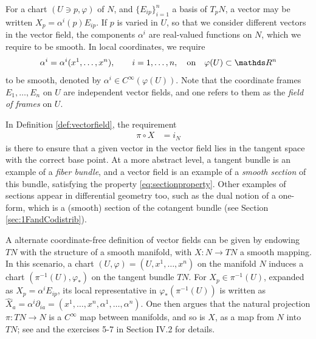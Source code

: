 For a chart $(U\ni p, \varphi)$ of $N$, and $\{E_{ip}\}_{i = 1}^n$ a basis of $T_pN$, a vector may be written $X_p = \alpha^i(p) E_{ip}$. If $p$ is varied in $U$, so that we consider different vectors in the vector field, the components $\alpha^i$ are real-valued functions on $N$, which we require to be smooth. In local coordinates, we require 
\begin{equation}\label{eq:vectorfieldcoeff}
\begin{aligned}
\alpha^i = \alpha^i(x^1, \dots, x^n), \qquad i = 1, \dots, n, \quad \text{on}\quad \varphi(U)\subset \R^n
\end{aligned}
\end{equation} 
to be smooth, denoted by $\alpha^i \in C^{\infty}(\varphi(U))$. Note that the coordinate frames $E_1, \dots, E_n$ on $U$ are independent vector fields, and one refers to them as the \textit{field of frames} on $U$. 
\begin{remark}
In Definition \ref{def:vectorfield}, the requirement 
\begin{align}\label{eq:sectionproperty}
\pi \circ X &= i_N
\end{align}
 is there to ensure that a given vector in the vector field lies in the tangent space with the correct base point. At a more abstract level, a tangent bundle is an example of a \textit{fiber bundle}, and a vector field is an example of a \textit{smooth section} of this bundle, satisfying the property \ref{eq:sectionproperty}. Other examples of sections appear in differential geometry too, such as the dual notion of a one-form, which is a (smooth) section of the cotangent bundle (see Section \ref{sec:1FandCodistrib}). 
\end{remark}


A alternate coordinate-free definition of vector fields can be given by endowing $TN$ with the structure of a smooth manifold, with $X:N\rightarrow TN$ a smooth mapping. In this scenario, a chart $(U, \varphi) = (U, x^1, \dots, x^n)$ on the manifold $N$ induces a chart $(\pi^{-1}(U), \varphi_*)$ on the tangent bundle $TN$. For $X_p\in \pi^{-1}(U)$, expanded as $X_p = \alpha^i E_{ip}$, its local representative in $\varphi_*(\pi^{-1}(U))$ is written as $\hat X_a = \alpha^i \partial_{ia} = (x^1, \dots, x^n, \alpha^1, \dots, \alpha^n)$. One then argues that the natural projection $\pi:TN\rightarrow N$ is a $C^{\infty}$ map between manifolds, and so is $X$, as a map from $N$ into $TN$; see \cite{nijmeijer_nonlinear_1990} and the exercises 5-7 in \cite{boothby_2002} Section IV.2 for details. 


